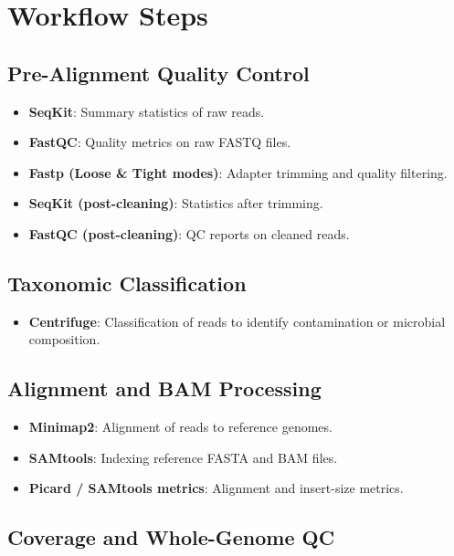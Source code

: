 \documentclass[13pt,letter]{article}
\begin{document}
\section{Workflow Steps}

\subsection{Pre-Alignment Quality Control}

\begin{itemize}
  \item \textbf{SeqKit}: Summary statistics of raw reads.
  \item \textbf{FastQC}: Quality metrics on raw FASTQ files.
  \item \textbf{Fastp (Loose \& Tight modes)}: Adapter trimming and quality filtering.
  \item \textbf{SeqKit (post-cleaning)}: Statistics after trimming.
  \item \textbf{FastQC (post-cleaning)}: QC reports on cleaned reads.
\end{itemize}

\subsection{Taxonomic Classification}

\begin{itemize}
  \item \textbf{Centrifuge}: Classification of reads to identify contamination or microbial composition.
\end{itemize}

\subsection{Alignment and BAM Processing}

\begin{itemize}
  \item \textbf{Minimap2}: Alignment of reads to reference genomes.
  \item \textbf{SAMtools}: Indexing reference FASTA and BAM files.
  \item \textbf{Picard / SAMtools metrics}: Alignment and insert-size metrics.
\end{itemize}

\subsection{Coverage and Whole-Genome QC}
\end{document}
